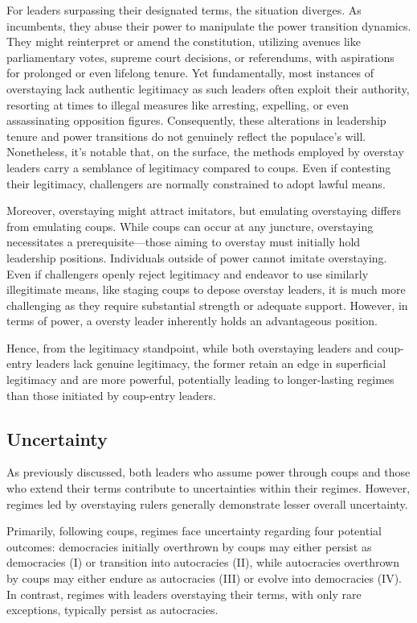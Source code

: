\documentclass[
  12pt,
  a4paper,
  12pt]{article}
\begin{document}
For leaders surpassing their designated terms, the situation diverges.
As incumbents, they abuse their power to manipulate the power transition
dynamics. They might reinterpret or amend the constitution, utilizing
avenues like parliamentary votes, supreme court decisions, or
referendums, with aspirations for prolonged or even lifelong tenure. Yet
fundamentally, most instances of overstaying lack authentic legitimacy
as such leaders often exploit their authority, resorting at times to
illegal measures like arresting, expelling, or even assassinating
opposition figures. Consequently, these alterations in leadership tenure
and power transitions do not genuinely reflect the populace's will.
Nonetheless, it's notable that, on the surface, the methods employed by
overstay leaders carry a semblance of legitimacy compared to coups. Even
if contesting their legitimacy, challengers are normally constrained to
adopt lawful means.

Moreover, overstaying might attract imitators, but emulating overstaying
differs from emulating coups. While coups can occur at any juncture,
overstaying necessitates a prerequisite---those aiming to overstay must
initially hold leadership positions. Individuals outside of power cannot
imitate overstaying. Even if challengers openly reject legitimacy and
endeavor to use similarly illegitimate means, like staging coups to
depose overstay leaders, it is much more challenging as they require
substantial strength or adequate support. However, in terms of power, a
oversty leader inherently holds an advantageous position.

Hence, from the legitimacy standpoint, while both overstaying leaders
and coup-entry leaders lack genuine legitimacy, the former retain an
edge in superficial legitimacy and are more powerful, potentially
leading to longer-lasting regimes than those initiated by coup-entry
leaders.

\hypertarget{uncertainty}{%
\subsection{Uncertainty}\label{uncertainty}}

As previously discussed, both leaders who assume power through coups and
those who extend their terms contribute to uncertainties within their
regimes. However, regimes led by overstaying rulers generally
demonstrate lesser overall uncertainty.

Primarily, following coups, regimes face uncertainty regarding four
potential outcomes: democracies initially overthrown by coups may either
persist as democracies (I) or transition into autocracies (II), while
autocracies overthrown by coups may either endure as autocracies (III)
or evolve into democracies (IV). In contrast, regimes with leaders
overstaying their terms, with only rare exceptions, typically persist as
autocracies.
\end{document}
